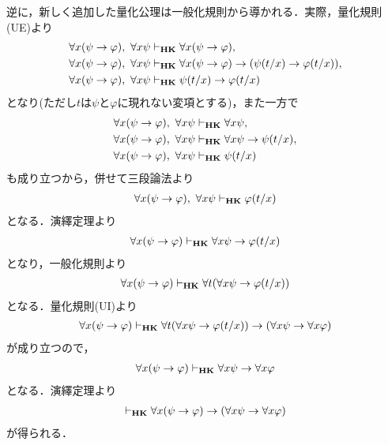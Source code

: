 	逆に，新しく追加した量化公理は一般化規則から導かれる．実際，量化規則(UE)より
	\begin{align}
		\forall x (\psi \rightarrow \varphi),\ \forall x \psi &\vdash_{{\scriptsize \mbox{{\bf HK}}}} \forall x (\psi \rightarrow \varphi), \\
		\forall x (\psi \rightarrow \varphi),\ \forall x \psi &\vdash_{{\scriptsize \mbox{{\bf HK}}}} \forall x (\psi \rightarrow \varphi)
		\rightarrow (\psi(t/x) \rightarrow \varphi(t/x)), \\
		\forall x (\psi \rightarrow \varphi),\ \forall x \psi &\vdash_{{\scriptsize \mbox{{\bf HK}}}} \psi(t/x) \rightarrow \varphi(t/x)
	\end{align}
	となり(ただし$t$は$\psi$と$\varphi$に現れない変項とする)，また一方で
	\begin{align}
		\forall x (\psi \rightarrow \varphi),\ \forall x \psi &\vdash_{{\scriptsize \mbox{{\bf HK}}}} \forall x \psi, \\
		\forall x (\psi \rightarrow \varphi),\ \forall x \psi &\vdash_{{\scriptsize \mbox{{\bf HK}}}} \forall x \psi \rightarrow \psi(t/x), \\
		\forall x (\psi \rightarrow \varphi),\ \forall x \psi &\vdash_{{\scriptsize \mbox{{\bf HK}}}} \psi(t/x)
	\end{align}
	も成り立つから，併せて三段論法より
	\begin{align}
		\forall x (\psi \rightarrow \varphi),\ \forall x \psi \vdash_{{\scriptsize \mbox{{\bf HK}}}} \varphi(t/x)
	\end{align}
	となる．演繹定理より
	\begin{align}
		\forall x (\psi \rightarrow \varphi) \vdash_{{\scriptsize \mbox{{\bf HK}}}} \forall x \psi  \rightarrow \varphi(t/x)
	\end{align}
	となり，一般化規則より
	\begin{align}
		\forall x (\psi \rightarrow \varphi) \vdash_{{\scriptsize \mbox{{\bf HK}}}} \forall t ( \forall x \psi  \rightarrow \varphi(t/x))
	\end{align}
	となる．量化規則(UI)より
	\begin{align}
		\forall x (\psi \rightarrow \varphi) \vdash_{{\scriptsize \mbox{{\bf HK}}}} \forall t ( \forall x \psi  \rightarrow \varphi(t/x)) \rightarrow
		(\forall x \psi \rightarrow \forall x \varphi)
	\end{align}
	が成り立つので，
	\begin{align}
		\forall x (\psi \rightarrow \varphi) \vdash_{{\scriptsize \mbox{{\bf HK}}}}
		\forall x \psi \rightarrow \forall x \varphi
	\end{align}
	となる．演繹定理より
	\begin{align}
		\vdash_{{\scriptsize \mbox{{\bf HK}}}} \forall x (\psi \rightarrow \varphi)
		\rightarrow (\forall x \psi \rightarrow \forall x \varphi)
	\end{align}
	が得られる．